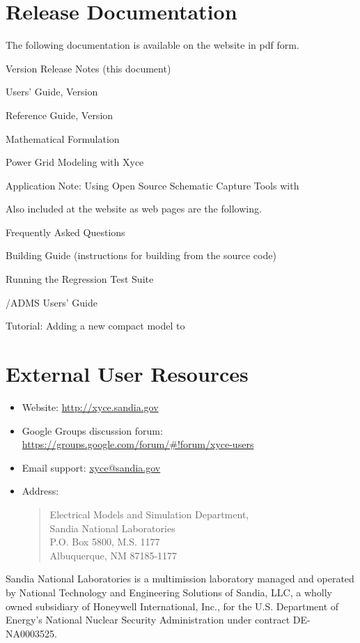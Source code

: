 \documentclass{article}
\begin{document}
\section{\Xyce{} Release \XyceVersionVar{} Documentation}
The following \Xyce{} documentation is available on the \Xyce{} website in pdf
form.
\begin{XyceItemize}
  \item \Xyce{} Version \XyceVersionVar{} Release Notes (this document)
  \item \Xyce{} Users' Guide, Version \XyceVersionVar{}
  \item \Xyce{} Reference Guide, Version \XyceVersionVar{}
  \item \Xyce{} Mathematical Formulation
  \item Power Grid Modeling with Xyce
  \item Application Note: Using Open Source Schematic Capture Tools with \Xyce{}
\end{XyceItemize}
Also included at the \Xyce{} website as web pages are the following.
\begin{XyceItemize}
  \item Frequently Asked Questions
  \item Building Guide (instructions for building \Xyce{} from the source code)
  \item Running the \Xyce{} Regression Test Suite
  \item \Xyce{}/ADMS Users' Guide
  \item Tutorial:  Adding a new compact model to \Xyce{}
\end{XyceItemize}


\section{External User Resources}
\begin{itemize}
  \item Website: {\color{XyceDeepRed}\url{http://xyce.sandia.gov}}
  \item Google Groups discussion forum:
    {\color{XyceDeepRed}\url{https://groups.google.com/forum/#!forum/xyce-users}}
  \item Email support:
    {\color{XyceDeepRed}\href{mailto:xyce@sandia.gov}{xyce@sandia.gov}}
  \item Address:
    \begin{quote}
            Electrical Models and Simulation Department,\\
            Sandia National Laboratories\\
            P.O. Box 5800, M.S. 1177\\
            Albuquerque, NM 87185-1177 \\
    \end{quote}
\end{itemize}

\vspace*{\fill}
Sandia National Laboratories is a multimission laboratory managed and operated by 
National Technology and Engineering Solutions of Sandia, LLC, a wholly owned subsidiary
of Honeywell International, Inc., for the U.S. Department of Energy's National Nuclear 
Security Administration under contract DE-NA0003525.
\end{document}
